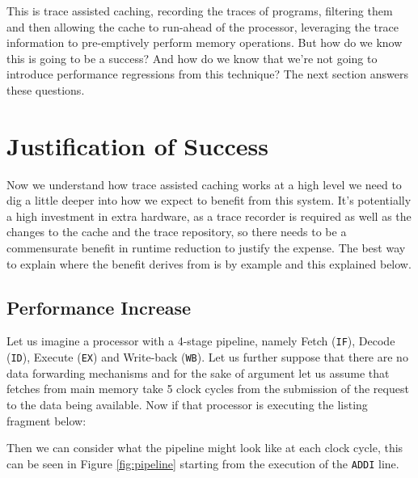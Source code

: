 This is trace assisted caching, recording the traces of programs, filtering them and then allowing the cache to run-ahead of the processor, leveraging the trace information to pre-emptively perform memory operations. But how do we know this is going to be a success? And how do we know that we're not going to introduce performance regressions from this technique? The next section answers these questions.

\section{Justification of Success}

Now we understand how trace assisted caching works at a high level we need to dig a little deeper into how we expect to benefit from this system. It's potentially a high investment in extra hardware, as a trace recorder is required as well as the changes to the cache and the trace repository, so there needs to be a commensurate benefit in runtime reduction to justify the expense. The best way to explain where the benefit derives from is by example and this explained below.

\subsection{Performance Increase}

Let us imagine a processor with a 4-stage pipeline, namely Fetch (\texttt{IF}), Decode (\texttt{ID}), Execute (\texttt{EX}) and Write-back (\texttt{WB}). Let us further suppose that there are no data forwarding mechanisms and for the sake of argument let us assume that fetches from main memory take 5 clock cycles from the submission of the request to the data being available. Now if that processor is executing the listing fragment below:



Then we can consider what the pipeline might look like at each clock cycle, this can be seen in Figure \ref{fig:pipeline} starting from the execution of the \texttt{ADDI} line.

\begin{sidewaysfigure}
	\begin{center}
		
		\caption[Pipeline Diagram - No Trace Assisted Caching]{The pipeline execution continues as normal until clock cycle 4 where the \texttt{LW} instruction enters its Execution phase. Because loading a value from main memory takes 5 clock cycles this extra latency is added not only to the \texttt{LW} but also to the \texttt{MUL} and \texttt{MV} instructions. Overall this leads to a program runtime of 14 clock cycles when the optimal time, assuming no pipeline stalls would be 8. To further clarify the memory system row contains \texttt{PR} and \texttt{AV} these stand for Processing and Available resp.}
		\label{fig:pipeline}
	\end{center}
\end{sidewaysfigure}

